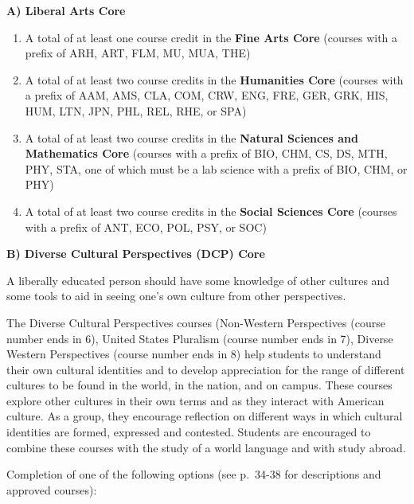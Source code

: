 \documentclass[
  letterpaper,
]{scrbook}
\providecommand{\tightlist}{%
  \setlength{\itemsep}{0pt}\setlength{\parskip}{0pt}}
\begin{document}
\textbf{A) Liberal Arts Core}

\begin{enumerate}
\def\labelenumi{\arabic{enumi}.}
\tightlist
\item
  A total of at least one course credit in the \textbf{Fine Arts Core}
  (courses with a prefix of ARH, ART, FLM, MU, MUA, THE)
\item
  A total of at least two course credits in the \textbf{Humanities Core}
  (courses with a prefix of AAM, AMS, CLA, COM, CRW, ENG, FRE, GER, GRK,
  HIS, HUM, LTN, JPN, PHL, REL, RHE, or SPA)
\item
  A total of at least two course credits in the \textbf{Natural Sciences
  and Mathematics Core} (courses with a prefix of BIO, CHM, CS, DS, MTH,
  PHY, STA, one of which must be a lab science with a prefix of BIO,
  CHM, or PHY)
\item
  A total of at least two course credits in the \textbf{Social Sciences
  Core} (courses with a prefix of ANT, ECO, POL, PSY, or SOC)
\end{enumerate}

\textbf{B) Diverse Cultural Perspectives (DCP) Core}

A liberally educated person should have some knowledge of other cultures
and some tools to aid in seeing one's own culture from other
perspectives.

The Diverse Cultural Perspectives courses (Non-Western Perspectives
(course number ends in 6), United States Pluralism (course number ends
in 7), Diverse Western Perspectives (course number ends in 8) help
students to understand their own cultural identities and to develop
appreciation for the range of different cultures to be found in the
world, in the nation, and on campus. These courses explore other
cultures in their own terms and as they interact with American culture.
As a group, they encourage reflection on different ways in which
cultural identities are formed, expressed and contested. Students are
encouraged to combine these courses with the study of a world language
and with study abroad.

Completion of one of the following options (see p.~34-38 for
descriptions and approved courses):
\end{document}
